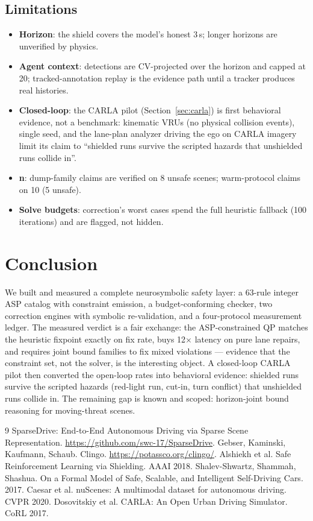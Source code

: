 \documentclass[11pt]{article}
\begin{document}
\subsection{Limitations}
\begin{itemize}
  \item \textbf{Horizon}: the shield covers the model's honest 3\,s;
  longer horizons are unverified by physics.
  \item \textbf{Agent context}: detections are CV-projected over the
  horizon and capped at 20; tracked-annotation replay is the evidence
  path until a tracker produces real histories.
  \item \textbf{Closed-loop}: the CARLA pilot
  (Section~\ref{sec:carla}) is first behavioral evidence, not a
  benchmark: kinematic VRUs (no physical collision events), single
  seed, and the lane-plan analyzer driving the ego on CARLA imagery
  limit its claim to ``shielded runs survive the scripted hazards
  that unshielded runs collide in''.
  \item \textbf{n}: dump-family claims are verified on 8 unsafe
  scenes; warm-protocol claims on 10 (5 unsafe).
  \item \textbf{Solve budgets}: correction's worst cases spend the
  full heuristic fallback (100 iterations) and are flagged, not
  hidden.
\end{itemize}

\section{Conclusion}
\label{sec:conclusion}

We built and measured a complete neurosymbolic safety layer: a
63-rule integer ASP catalog with constraint emission, a
budget-conforming checker, two correction engines with symbolic
re-validation, and a four-protocol measurement ledger. The measured
verdict is a fair exchange: the ASP-constrained QP matches the
heuristic fixpoint exactly on fix rate, buys 12$\times$ latency on
pure lane repairs, and requires joint bound families to fix mixed
violations --- evidence that the constraint set, not the solver, is
the interesting object. A closed-loop CARLA pilot then converted the
open-loop rates into behavioral evidence: shielded runs survive the
scripted hazards (red-light run, cut-in, turn conflict) that
unshielded runs collide in. The remaining gap is known and scoped:
horizon-joint bound reasoning for moving-threat scenes.


\begin{thebibliography}{9}
 SparseDrive: End-to-End Autonomous Driving via
Sparse Scene Representation. \url{https://github.com/swc-17/SparseDrive}.
 Gebser, Kaminski, Kaufmann, Schaub. Clingo.
\url{https://potassco.org/clingo/}.
 Alshiekh et al. Safe Reinforcement Learning
via Shielding. AAAI 2018.
 Shalev-Shwartz, Shammah, Shashua. On a Formal Model of
Safe, Scalable, and Intelligent Self-Driving Cars. 2017.
 Caesar et al. nuScenes: A multimodal dataset for
autonomous driving. CVPR 2020.
 Dosovitskiy et al. CARLA: An Open Urban Driving
Simulator. CoRL 2017.
\end{thebibliography}
\end{document}
